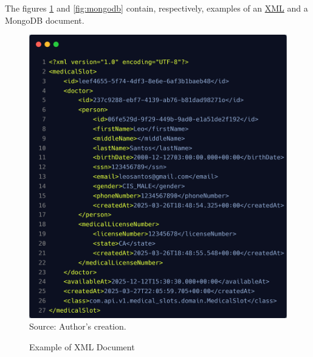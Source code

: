 The figures \ref{fig:xml} and \ref{fig:mongodb} contain, respectively, examples of an \hyperref[appendix:glossary]{XML} and a MongoDB document.

\begin{figure}[H]
    \centering
    \caption{Example of XML Document}
    \includegraphics[width=1\linewidth]{figures/db/xml.png}
    \label{fig:xml}
    \footnotesize Source: Author's creation.
\end{figure}

